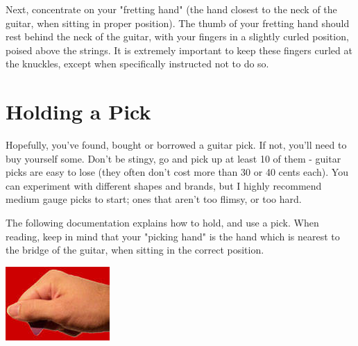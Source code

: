 Next, concentrate on your "fretting hand" (the hand closest to the neck of the
guitar, when sitting in proper position). The thumb of your fretting hand
should rest behind the neck of the guitar, with your fingers in a slightly
curled position, poised above the strings. It is extremely important to keep
these fingers curled at the knuckles, except when specifically instructed not
to do so. 

\section{Holding a Pick}
Hopefully, you've found, bought or borrowed a guitar pick. If not, you'll need
to buy yourself some. Don't be stingy, go and pick up at least 10 of them -
guitar picks are easy to lose (they often don't cost more than 30 or 40 cents
each). You can experiment with different shapes and brands, but I highly
recommend medium gauge picks to start; ones that aren't too flimsy, or too
hard.

The following documentation explains how to hold, and use a pick. When reading,
keep in mind that your "picking hand" is the hand which is nearest to the
bridge of the guitar, when sitting in the correct position.

\includegraphics{partone/howtoholdapick.jpg}

